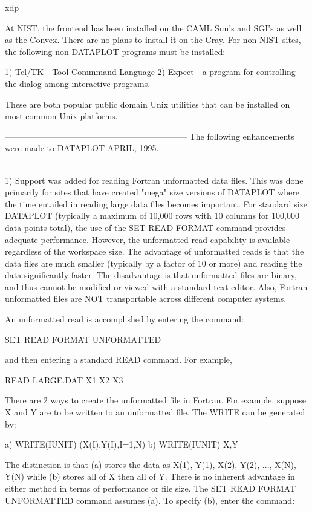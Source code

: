 {    xdp

At NIST, the frontend has been installed on the CAML Sun's and
SGI's as well as the Convex.  There are no plans to install it
on the Cray.  For non-NIST sites, the following non-DATAPLOT programs
must be installed:

   1) Tcl/TK   - Tool Commmand Language
   2) Expect   - a program for controlling the dialog among 
                 interactive programs.

These are both popular public domain Unix utilities that can be
installed on most common Unix platforms.

-----------------------------------------------------------------
The following enhancements were made to DATAPLOT APRIL, 1995.   
-----------------------------------------------------------------

 1) Support was added for reading Fortran unformatted data files.
    This was done primarily for sites that have created "mega" size
    versions of DATAPLOT where the time entailed in reading large
    data files becomes important.  For standard size DATAPLOT
    (typically a maximum of 10,000 rows with 10 columns for 100,000
    data points total), the use of the SET READ FORMAT command
    provides adequate performance.  However, the unformatted read
    capability is available regardless of the workspace size.  The
    advantage of unformatted reads is that the data files are much
    smaller (typically by a factor of 10 or more) and reading the
    data significantly faster.  The disadvantage is that unformatted
    files are binary, and thus cannot be modified or viewed with a
    standard text editor.  Also, Fortran unformatted files are NOT
    transportable across different computer systems.

    An unformatted read is accomplished by entering the command:

       SET READ FORMAT UNFORMATTED

    and then entering a standard READ command.  For example,

       READ LARGE.DAT X1 X2 X3

    There are 2 ways to create the unformatted file in Fortran.  For
    example, suppose X and Y are to be written to an unformatted
    file.  The WRITE can be generated by:

    a)    WRITE(IUNIT) (X(I),Y(I),I=1,N)
    b)    WRITE(IUNIT) X,Y

    The distinction is that (a) stores the data as X(1), Y(1),
    X(2), Y(2), ..., X(N), Y(N) while (b) stores all of X then
    all of Y.  There is no inherent advantage in either method in
    terms of performance or file size.  The SET READ FORMAT
    UNFORMATTED command assumes (a).  To specify (b), enter the
    command:

}
